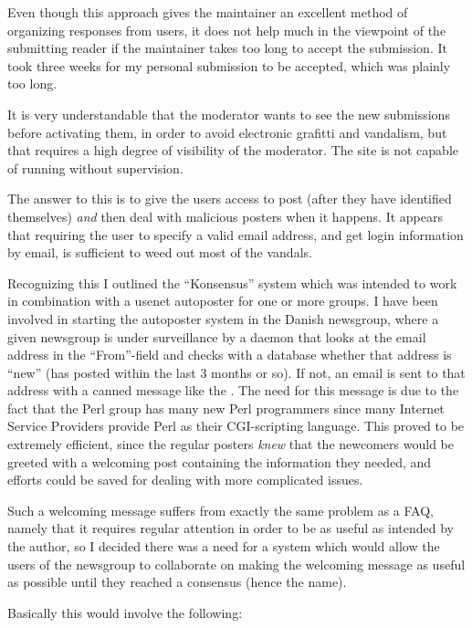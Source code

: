 Even though this approach gives the maintainer an excellent method of
organizing responses from users, it does not help much in the
viewpoint of the submitting reader if the maintainer takes too long to
accept the submission.  It took three weeks for my personal
submission to be accepted, which was plainly too long.

It is very understandable that the moderator wants to see the new
submissions before activating them, in order to avoid electronic
grafitti and vandalism, but that requires a high degree of visibility
of the moderator.  The site is not capable of running without
supervision.

The answer to this is to give the users access to post (after they
have identified themselves) \textit{and} then deal with malicious
posters when it happens.  It appears that requiring the user to
specify a valid email address, and get login information by email, is
sufficient to weed out most of the vandals.

Recognizing this I outlined the ``Konsensus'' system which was
intended to work in combination with a usenet autoposter for one or
more groups.  I have been involved in starting the autoposter system
in the Danish newsgroup, where a given newsgroup is under surveillance
by a daemon that looks at the email address in the ``From''-field and
checks with a database whether that address is ``new'' (has posted
within the last 3 months or so).  If not, an email is sent to that
address with a canned message like the
.  The need for this message is due to the fact that the Perl
group has many new Perl programmers since many Internet Service
Providers provide Perl as their CGI-scripting language.  This proved
to be extremely efficient, since the regular posters \textit{knew}
that the newcomers would be greeted with a welcoming post containing
the information they needed, and efforts could be saved for dealing
with more complicated issues.

Such a welcoming message suffers from exactly the same problem as a
FAQ, namely that it requires regular attention in order to be as
useful as intended by the author, so I decided there was a need for a
system which would allow the users of the newsgroup to collaborate on
making the welcoming message as useful as possible until they reached
a consensus (hence the name).

Basically this would involve the following:

